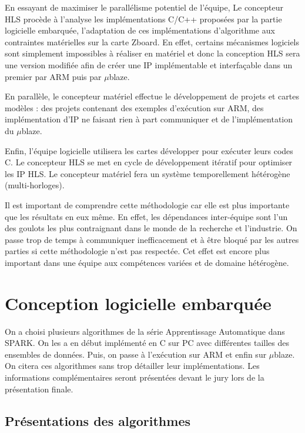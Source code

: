\documentclass[12pt,a4paper]{article}
\begin{document}
En essayant de maximiser le parallélisme potentiel de l'équipe, Le concepteur HLS procède à l'analyse les implémentations C/C++ proposées par la partie logicielle embarquée, l'adaptation de ces implémentations d'algorithme aux contraintes matérielles sur la carte Zboard. En effet, certains mécanismes logiciels sont simplement impossibles à réaliser en matériel et donc la conception HLS sera une version modifiée afin de créer une IP implémentable et interfaçable dans un premier par ARM puis par $\mu$blaze.

En parallèle, le concepteur matériel effectue le développement de projets et cartes modèles : des projets contenant des exemples d'exécution sur ARM, des implémentation d'IP ne faisant rien à part communiquer et de l'implémentation du $\mu$blaze.

Enfin, l'équipe logicielle utilisera les cartes développer pour exécuter leurs codes C. Le concepteur HLS se met en cycle de développement itératif pour optimiser les IP HLS. Le concepteur matériel fera un système temporellement hétérogène (multi-horloges).

Il est important de comprendre cette méthodologie car elle est plus importante que les résultats en eux même. En effet, les dépendances inter-équipe sont l'un des goulots les plus contraignant dans le monde de la recherche et l'industrie. On passe trop de temps à communiquer inefficacement et à être bloqué par les autres parties si cette méthodologie n'est pas respectée. Cet effet est encore plus important dans une équipe aux compétences variées et de domaine hétérogène.

\section{Conception logicielle embarquée}
On a choisi plusieurs algorithmes de la série Apprentissage Automatique dans SPARK. On les a en début implémenté en C sur PC avec différentes tailles des ensembles de données. Puis, on passe à l'exécution sur ARM et enfin sur $\mu$blaze. On citera ces algorithmes sans trop détailler leur implémentations. Les informations complémentaires seront présentées devant le jury lors de la présentation finale.

\subsection{Présentations des algorithmes}
\end{document}
